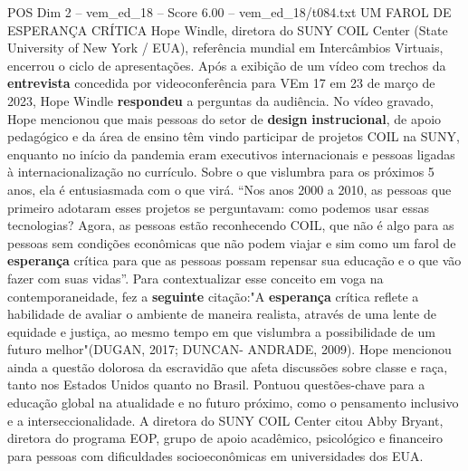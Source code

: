 \begin{textsample}{POS Dim 2 – vem\_ed\_18 – Score 6.00 – vem\_ed\_18/t084.txt}  \label{ex:f2_pos_081}
UM FAROL DE ESPERANÇA CRÍTICA Hope Windle, diretora do SUNY COIL Center (State University of New York / EUA), referência mundial em Intercâmbios Virtuais, encerrou o ciclo de apresentações.
Após a exibição de um vídeo com trechos da \textbf{entrevista} concedida por videoconferência para VEm 17 em 23 de março de 2023, Hope Windle \textbf{respondeu} a perguntas da audiência.
No vídeo gravado, Hope mencionou que mais pessoas do setor de \textbf{design} \textbf{instrucional}, de apoio pedagógico e da área de ensino têm vindo participar de projetos COIL na SUNY, enquanto no início da pandemia eram executivos internacionais e pessoas ligadas à internacionalização no currículo.
Sobre o que vislumbra para os próximos 5 anos, ela é entusiasmada com o que virá. “Nos anos 2000 a 2010, as pessoas que primeiro adotaram esses projetos se perguntavam: como podemos usar essas tecnologias?
Agora, as pessoas estão reconhecendo COIL, que não é algo para as pessoas sem condições econômicas que não podem viajar e sim como um farol de \textbf{esperança} crítica para que as pessoas possam repensar sua educação e o que vão fazer com suas vidas”.
Para contextualizar esse conceito em voga na contemporaneidade, fez a \textbf{seguinte} citação:"A \textbf{esperança} crítica reflete a habilidade de avaliar o ambiente de maneira realista, através de uma lente de equidade e justiça, ao mesmo tempo em que vislumbra a possibilidade de um futuro melhor"(DUGAN, 2017; DUNCAN- ANDRADE, 2009).
Hope mencionou ainda a questão dolorosa da escravidão que afeta discussões sobre classe e raça, tanto nos Estados Unidos quanto no Brasil.
Pontuou questões-chave para a educação global na atualidade e no futuro próximo, como o pensamento inclusivo e a interseccionalidade.
A diretora do SUNY COIL Center citou Abby Bryant, diretora do programa EOP, grupo de apoio acadêmico, psicológico e financeiro para pessoas com dificuldades socioeconômicas em universidades dos EUA.

\end{textsample}
